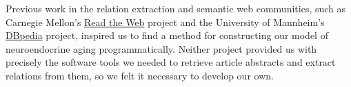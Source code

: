 Previous work in the relation extraction and semantic web communities, such as Carnegie Mellon's
\href{http://rtw.ml.cmu.edu/rtw/}{Read the Web} \cite{Carlson10towardan} project and the University of Mannheim's
\href{http://dbpedia.org/}{DBpedia} \cite{dbpedia-swj} project, inspired us to find a method for constructing
our model of neuroendocrine aging programmatically. Neither project provided us with precisely
the software tools we needed to retrieve article abstracts and extract relations from them,
so we felt it necessary to develop our own.
